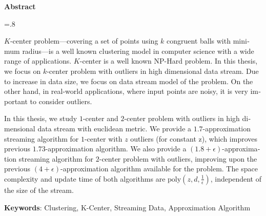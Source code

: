 


\pagestyle{empty}

\begin{latin}

\begin{center}
\textbf{Abstract}
\end{center}
\baselineskip=.8\baselineskip

$K$-center problem---covering a set of points using $k$ congruent balls with minimum radius---is a well known clustering model in computer science with a wide range of applications. $K$-center is a well known NP-Hard problem. In this thesis, we focus on $k$-center problem with outliers in high dimensional data stream. Due to increase in data size, we focus on data stream model of the problem. On the other hand, in real-world applications, where input points are noisy, it is very important to consider outliers.

In this thesis, we study $1$-center and $2$-center problem with outliers in high dimensional data stream with euclidean metric. We provide a $1.7$-approximation streaming algorithm for $1$-center with $z$ outliers (for constant z), which improves previous $1.73$-approximation algorithm. We also provide a $(1.8 + \epsilon)$-approximation streaming algorithm for $2$-center problem with outliers, improving upon the previous $(4 + \epsilon)$-approximation algorithm available for the problem. The space complexity and update time of both algorithms are $\text{poly}(z, d, \frac{1}{\epsilon})$, independent of the size of the stream.

\bigskip\noindent\textbf{Keywords}:
Clustering, K-Center, Streaming Data, Approximation Algorithm

\end{latin}

\newpage
